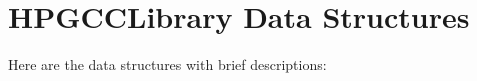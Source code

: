 \section{HPGCCLibrary Data Structures}
Here are the data structures with brief descriptions:\begin{CompactList}
\item{}
\item{}
\end{CompactList}

